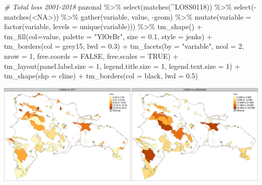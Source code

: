 \documentclass[10pt,landscape,a3paper]{article}
\newenvironment{Shaded}{\begin{snugshade}}{\end{snugshade}}
\newcommand{\AttributeTok}[1]{\textcolor[rgb]{0.77,0.63,0.00}{#1}}
\newcommand{\CommentTok}[1]{\textcolor[rgb]{0.56,0.35,0.01}{\textit{#1}}}
\newcommand{\ConstantTok}[1]{\textcolor[rgb]{0.00,0.00,0.00}{#1}}
\newcommand{\DecValTok}[1]{\textcolor[rgb]{0.00,0.00,0.81}{#1}}
\newcommand{\FloatTok}[1]{\textcolor[rgb]{0.00,0.00,0.81}{#1}}
\newcommand{\FunctionTok}[1]{\textcolor[rgb]{0.00,0.00,0.00}{#1}}
\newcommand{\NormalTok}[1]{#1}
\newcommand{\SpecialCharTok}[1]{\textcolor[rgb]{0.00,0.00,0.00}{#1}}
\newcommand{\StringTok}[1]{\textcolor[rgb]{0.31,0.60,0.02}{#1}}
\begin{document}
\begin{Shaded}
\begin{Highlighting}[]

\CommentTok{\# Total loss 2001{-}2018}
\NormalTok{pazonal }\SpecialCharTok{\%\textgreater{}\%} \FunctionTok{select}\NormalTok{(}\FunctionTok{matches}\NormalTok{(}\StringTok{\textquotesingle{}\^{}LOSS0118\textquotesingle{}}\NormalTok{)) }\SpecialCharTok{\%\textgreater{}\%} \FunctionTok{select}\NormalTok{(}\SpecialCharTok{{-}}\FunctionTok{matches}\NormalTok{(}\StringTok{\textquotesingle{}\textless{}NA\textgreater{}\textquotesingle{}}\NormalTok{)) }\SpecialCharTok{\%\textgreater{}\%} 
  \FunctionTok{gather}\NormalTok{(variable, value, }\SpecialCharTok{{-}}\NormalTok{geom) }\SpecialCharTok{\%\textgreater{}\%}
  \FunctionTok{mutate}\NormalTok{(}\AttributeTok{variable =} \FunctionTok{factor}\NormalTok{(variable, }\AttributeTok{levels =} \FunctionTok{unique}\NormalTok{(variable))) }\SpecialCharTok{\%\textgreater{}\%} 
  \FunctionTok{tm\_shape}\NormalTok{() }\SpecialCharTok{+}
  \FunctionTok{tm\_fill}\NormalTok{(}\AttributeTok{col=}\StringTok{\textquotesingle{}value\textquotesingle{}}\NormalTok{, }\AttributeTok{palette =} \StringTok{"YlOrBr"}\NormalTok{, }\AttributeTok{size =} \FloatTok{0.1}\NormalTok{, }\AttributeTok{style =} \StringTok{\textquotesingle{}jenks\textquotesingle{}}\NormalTok{) }\SpecialCharTok{+}
  \FunctionTok{tm\_borders}\NormalTok{(}\AttributeTok{col =} \StringTok{\textquotesingle{}grey15\textquotesingle{}}\NormalTok{, }\AttributeTok{lwd =} \FloatTok{0.3}\NormalTok{) }\SpecialCharTok{+}
  \FunctionTok{tm\_facets}\NormalTok{(}\AttributeTok{by =} \StringTok{"variable"}\NormalTok{, }\AttributeTok{ncol =} \DecValTok{2}\NormalTok{, }\AttributeTok{nrow =} \DecValTok{1}\NormalTok{, }\AttributeTok{free.coords =} \ConstantTok{FALSE}\NormalTok{, }\AttributeTok{free.scales =} \ConstantTok{TRUE}\NormalTok{) }\SpecialCharTok{+}
  \FunctionTok{tm\_layout}\NormalTok{(}\AttributeTok{panel.label.size =} \DecValTok{1}\NormalTok{, }\AttributeTok{legend.title.size =} \DecValTok{1}\NormalTok{, }\AttributeTok{legend.text.size =} \DecValTok{1}\NormalTok{) }\SpecialCharTok{+} 
  \FunctionTok{tm\_shape}\NormalTok{(}\AttributeTok{shp =}\NormalTok{ cline) }\SpecialCharTok{+} \FunctionTok{tm\_borders}\NormalTok{(}\AttributeTok{col =} \StringTok{\textquotesingle{}black\textquotesingle{}}\NormalTok{, }\AttributeTok{lwd =} \FloatTok{0.5}\NormalTok{)}
\end{Highlighting}
\end{Shaded}

\begin{center}\includegraphics{img/data-download-preparation-eda/zonal-pa-6} \end{center}
\end{document}

